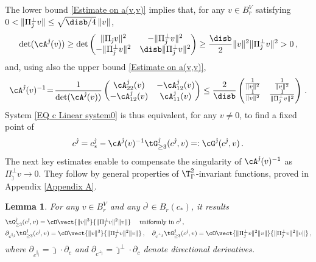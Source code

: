 \documentclass[11pt,a4paper,reqno]{article}
\numberwithin{equation}{section}
\newtheorem{lemma}[theorem]{Lemma}
\theoremstyle{definition}
\begin{document}
The lower bound \eqref{Estimate on a(v,v)} implies that, 
for any $v\in B_r^V$ satisfying $0<\|
    \Pi_{\hat \jmath}^\bot v  \|\leq \sqrt{\disb/4}\, \|v\|$,  
$$
\det(\cA^{\hat \jmath}(v))  \geq \det   
        \left(\begin{matrix}
                \|\Pi_{\hat \jmath} v\|^2 & -\| \Pi_{\hat \jmath}^\bot v \|^2 \\
                -\|\Pi_{\hat \jmath}^\bot v \|^2 & \disb  \| \Pi_{\hat \jmath}^\bot v \|^2
            \end{matrix}\right) \geq  \frac \disb 2\|v\|^2\|\Pi_{\hat \jmath}^\bot v \|^2>0\, ,
 $$
 and, using also  the upper bound  
    \eqref{Estimate on a(v,v)}, 
    \begin{equation}\label{lem:c near PJ estimate 3}
        \cA^{\hat \jmath}(v)^{-1} \! = \! \frac{1}{\det(\cA^{\hat \jmath}(v))}
        \left(\begin{matrix}
           \cA_{22}^{\hat \jmath}(v)  & -\cA_{12}^{\hat \jmath}(v) \\
           -\cA_{12}^{\hat \jmath}(v) &  \cA_{11}^{\hat \jmath}(v) 
        \end{matrix}\right) \leq \frac{2}{\disb} \left(\begin{matrix}
            \frac1{\|v\|^2} & \frac1{\|v\|^2}\\
            \frac1{\|v\|^2}  & \frac1{\|\Pi_{\hat \jmath}^\bot v \|^2} 
        \end{matrix}\right) \, . 
    \end{equation}
System \eqref{EQ c Linear system0} is thus equivalent,
for any $v \neq 0 $, to find a
fixed point of 
\[
c^{\hat \jmath} = c^{\hat \jmath}_*-\cA^{\hat \jmath} (v)^{-1} \tG^{\hat \jmath}_{\geq 3}  (c^{\hat \jmath},v) =: \cG^{\hat \jmath}(c^{\hat \jmath},v) \, . 
\]
The next key  estimates  
enable to compensate the singularity 
of $ \cA^{\hat \jmath} (v)^{-1} $ 
as $ \Pi_{\hat \jmath}^\bot v \to 0 $. 
They follow by  general properties  of  $\T^2_\Gamma$-invariant functions, proved in Appendix \ref{Appendix A}.

   \begin{lemma} 
    For any $v\in B_{r}^V$ and any $c^{\hat \jmath}\in B_{r}(c_*)$, it results
    \begin{align}  \label{Estimates on g}
  &       \tG^{\hat \jmath}_{\geq 3}(c^{\hat \jmath},v)
        =\cO\vect{\|v\|^3}{\| \Pi_{\hat \jmath}^\bot v \|^2\|v\|} \quad \text{
    uniformly in} \ c^{\hat \jmath} \, , 
         \\
         &\partial_{c^{\parallel_{\hat \jmath}}}
         \tG^{\hat \jmath}_{\geq 3}(c^{\hat \jmath},v)
                =\cO\vect{\|v\|^3}{\| \Pi_{\hat \jmath}^\bot v \|^2\|v\|} \, , \quad \partial_{c^{\bot_{\hat \jmath}}}\tG^{\hat \jmath}_{\geq 3}(c^{\hat \jmath},v)
        =\cO\vect{\| \Pi_{\hat \jmath}^\bot v \|^2\|v\|}{\| \Pi_{\hat \jmath}^\bot v \|^2\|v\|} \, , 
        \label{Partial c1 g}
    \end{align}
where 
  $ \partial_{c^{\parallel_{\hat \jmath}}}=\hat\jmath \cdot \partial_c $ and  $  \partial_{c^{\bot_{\hat \jmath}}}=\hat\jmath^\bot \cdot \partial_c $
denote directional derivatives.
    \end{lemma}
    
\end{document}
